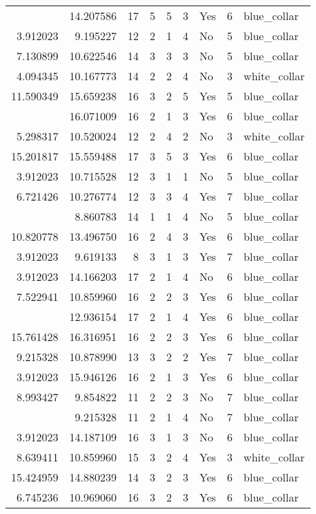 \documentclass[
]{article}
\begin{document}
\begin{longtable}[t]{rrrrrllrl}
\addlinespace
14.759436 & 14.207586 & 17 & 5 & 5 & 3 & Yes & 6 & blue\_collar\\
3.912023 & 9.195227 & 12 & 2 & 1 & 4 & No & 5 & blue\_collar\\
7.130899 & 10.622546 & 14 & 3 & 3 & 3 & No & 5 & blue\_collar\\
4.094345 & 10.167773 & 14 & 2 & 2 & 4 & No & 3 & white\_collar\\
11.590349 & 15.659238 & 16 & 3 & 2 & 5 & Yes & 5 & blue\_collar\\
\addlinespace
3.912023 & 16.071009 & 16 & 2 & 1 & 3 & Yes & 6 & blue\_collar\\
5.298317 & 10.520024 & 12 & 2 & 4 & 2 & No & 3 & white\_collar\\
15.201817 & 15.559488 & 17 & 3 & 5 & 3 & Yes & 6 & blue\_collar\\
3.912023 & 10.715528 & 12 & 3 & 1 & 1 & No & 5 & blue\_collar\\
6.721426 & 10.276774 & 12 & 3 & 3 & 4 & Yes & 7 & blue\_collar\\
\addlinespace
3.912023 & 8.860783 & 14 & 1 & 1 & 4 & No & 5 & blue\_collar\\
10.820778 & 13.496750 & 16 & 2 & 4 & 3 & Yes & 6 & blue\_collar\\
3.912023 & 9.619133 & 8 & 3 & 1 & 3 & Yes & 7 & blue\_collar\\
3.912023 & 14.166203 & 17 & 2 & 1 & 4 & No & 6 & blue\_collar\\
7.522941 & 10.859960 & 16 & 2 & 2 & 3 & Yes & 6 & blue\_collar\\
\addlinespace
3.912023 & 12.936154 & 17 & 2 & 1 & 4 & Yes & 6 & blue\_collar\\
15.761428 & 16.316951 & 16 & 2 & 2 & 3 & Yes & 6 & blue\_collar\\
9.215328 & 10.878990 & 13 & 3 & 2 & 2 & Yes & 7 & blue\_collar\\
3.912023 & 15.946126 & 16 & 2 & 1 & 3 & Yes & 6 & blue\_collar\\
8.993427 & 9.854822 & 11 & 2 & 2 & 3 & No & 7 & blue\_collar\\
\addlinespace
3.912023 & 9.215328 & 11 & 2 & 1 & 4 & No & 7 & blue\_collar\\
3.912023 & 14.187109 & 16 & 3 & 1 & 3 & No & 6 & blue\_collar\\
8.639411 & 10.859960 & 15 & 3 & 2 & 4 & Yes & 3 & white\_collar\\
15.424959 & 14.880239 & 14 & 3 & 2 & 3 & Yes & 6 & blue\_collar\\
6.745236 & 10.969060 & 16 & 3 & 2 & 3 & Yes & 6 & blue\_collar\\

\end{longtable}
\end{document}
